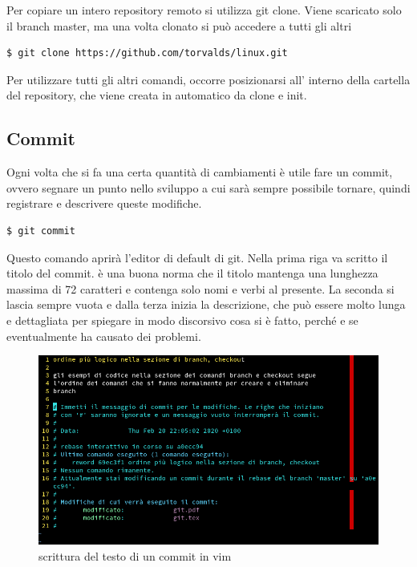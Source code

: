 \documentclass{article} \usepackage[textwidth=19cm,textheight=24cm]{geometry}
\begin{document}
Per copiare un intero repository remoto si utilizza git clone. Viene scaricato
solo il branch master, ma una volta clonato si può accedere a tutti gli altri

\begin{verbatim}
$ git clone https://github.com/torvalds/linux.git
\end{verbatim}

Per utilizzare tutti gli altri comandi, occorre posizionarsi all' interno della
cartella del repository, che viene creata in automatico da clone e init.

\subsection{Commit}

Ogni volta che si fa una certa quantità di cambiamenti è utile fare un commit,
ovvero segnare un punto nello sviluppo a cui sarà sempre possibile tornare,
quindi registrare e descrivere queste modifiche. 

\begin{verbatim}
$ git commit
\end{verbatim}

Questo comando aprirà l'editor di default di git. Nella prima riga va scritto il
titolo del commit. è una buona norma che il titolo mantenga una lunghezza
massima di 72 caratteri e contenga solo nomi e verbi al presente. La seconda si
lascia sempre vuota e dalla terza inizia la descrizione, che può essere
molto lunga e dettagliata per spiegare in modo discorsivo cosa si è fatto, 
perché e se eventualmente ha causato dei problemi.

\begin{figure}
\includegraphics[width=6in]{vimEditCommit.png}
\centering
\caption{scrittura del testo di un commit in vim}
\end{figure}
\end{document}
